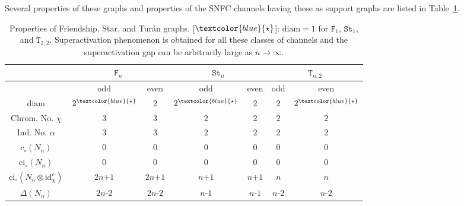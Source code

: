 \documentclass[12pt,a4paper]{article}
\begin{document}
\noindent Several properties of these graphs and properties of the SNFC channels having these as support graphs are listed in Table~\ref{tab:list}.  
\clearpage
\begin{table}[!t]
\centering
\begin{tabular}{|c||c|c|c|c|c|c|}
\hline
& \multicolumn{2}{c|}{$\mathtt{F}_n$} & \multicolumn{2}{c|}{$\mathtt{St}_n$}  & \multicolumn{2}{c|}{$\mathtt{T}_{n,2}$} \\ \hline\hline
 & odd & even & odd & even & odd & even \\ \hline
$\mathrm{diam}$ & $2^{\textcolor{blue}{\star}}$ & $2$ & $2^{\textcolor{blue}{\star}}$ & $2$ & $2$ & $2^{\textcolor{blue}{\star}}$ \\ \hline
Chrom. No. $\chi$ & $3$ & $3$ & $2$ & $2$ & $2$ & $2$ \\ \hline
Ind. No. $\alpha$  & $3$ & $3$ & $2$ & $2$ & $2$ & $2$ \\ \hline
$c_\circ(N_n)$ & 0 & 0 & 0 & 0 & 0 & 0 \\ \hline
$\mathrm{ci}_\circ(N_n)$ & 0 & 0 & 0 & 0 & 0 & 0 \\ \hline
$\mathrm{ci}_\circ(N_n\otimes\mathrm{id}^c_\chi)$ & $2n$+$1$ & $2n$+$1$ & $n$+$1$ & $n$+$1$ & $n$ & $n$ \\ \hline
$\Delta(N_n)$ & $2n$-$2$ & $2n$-$2$ & $n$-$1$ & $n$-$1$ & $n$-$2$ & $n$-$2$ \\ \hline
\end{tabular}
\caption{Properties of Friendship, Star, and Turán graphs. [${\textcolor{blue}{\star}}$]: $\mathrm{diam}=1$ for $\mathtt{F}_1$, $\mathtt{St}_1$, and $\mathtt{T}_{2,2}$. Superactivation phenomenon is obtained for all these classes of channels and the superactivation gap can be arbitrarily large as $n\to\infty$.}
\label{tab:list}
\end{table}
\end{document}
